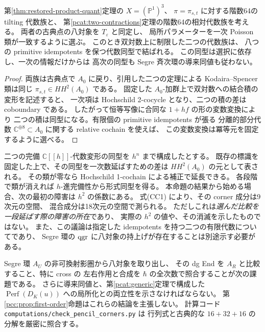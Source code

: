 \begin{proposition}[二つの圏量子化の一次における一致]
\label{pcc:prop:first-order}
第\ref{thm:restored-product-quant}定理の $X=(\mathbb P^1)^3$、
$\pi=\pi_{s,t}$ に対する階数64の tilting 代数族と、
第\ref{pcat:two-contractions}定理の階数64の相対代数族を考える。
両者の古典点の八対象を $T_\varepsilon$ と同定し、
局所パラメーターを一次 Poisson 類が一致するように選ぶ。
このとき双対数上に制限した二つの代数族は、
八つの primitive idempotents を保つ代数同型で結ばれる。
この同型は選択に依存し、一次の情報だけからは
高次の同型も Segre 斉次環の導来同値も従わない。
\end{proposition}
\begin{proof}
両族は古典点で $A_0$ に戻り、引用した二つの定理による
Kodaira--Spencer 類は同じ $\pi_{s,t}\in HH^2(A_0)$ である。
固定した $A_0$-加群上で双対数への結合積の変形を記述すると、
一次項は Hochschild 2-cocycle となり、二つの積の差は coboundary である。
したがって恒等写像に合同な $1+h f$ の形の変数変換により
二つの積は同型になる。有限個の primitive idempotents が張る
分離的部分代数
$\mathbb C^{\oplus8}\subset A_0$ に関する relative cochain を使えば、
この変数変換は冪等元を固定するように選べる。
\end{proof}

\begin{remark}[高次への帰着]
\label{pcc:rem:obstruction}
二つの完備 $\mathbb C[[h]]$-代数変形の同型を $h^n$ まで構成したとする。
既存の標識を固定した上で、その同型を一次数延ばすための差は
$HH^2(A_0)$ の元として表される。
その類が零なら Hochschild 1-cochain による補正で延長できる。
各段階で類が消えれば $h$-進完備性から形式同型を得る。
本命題の結果から始める場合、次の最初の障害は $h^2$ の係数にある。
式(CC1) により、その corner 成分は9次元の空間、
混合成分は18次元の空間で測られる。
ただしこれは\emph{選んだ比較を一段延ばす際の障害の所在}であり、
実際の $h^2$ の値や、その消滅を示したものではない。
また、この議論は指定した idempotents を持つ二つの有限代数についてであり、
Segre 環の $\operatorname{qgr}$ に八対象の持上げが存在することは別途示す必要がある。
\end{remark}

\begin{remark}[残る厳密な比較]
Segre 環 $A_U$ の非可換射影圏から八対象を取り出し、
その dg End を $A_R$ と比較すること、特に cross の
左右作用と合成を $\hbar$ の全次数で照合することが次の課題である。
さらに導来同値と、第\ref{pcat:generic}定理で構成した
$\operatorname{Perf}(D_K(u))$ への局所化との両立性を示さなければならない。
第\ref{pcc:prop:first-order}命題はこれらの結論を主張しない。
計算コード \texttt{computations/check\_pencil\_corners.py} は
行列式と古典的な $16+32+16$ の分解を厳密に照合する。
\end{remark}

